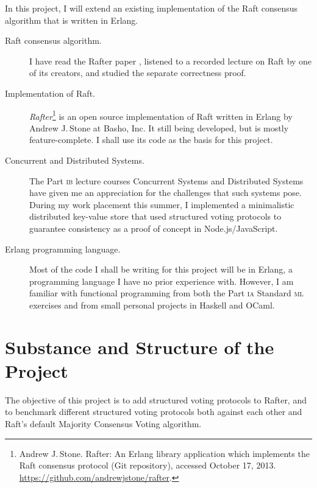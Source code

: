 \documentclass[12pt,chapterprefix=true,toc=bibliography,numbers=noendperiod,
               footnotes=multiple,twoside]{scrreprt}
\begin{document}
In this project, I will extend an existing implementation of the Raft consensus algorithm that is written in Erlang.

\begin{description}

\item[Raft consensus algorithm.] I have read the Rafter paper \autocite{raft}, listened to a recorded lecture on Raft by one of its creators, and studied the separate correctness proof.

\item[Implementation of Raft.] \emph{Rafter}\footnote{Andrew J.\,Stone. Rafter: An Erlang library application which implements the Raft consensus protocol (Git repository), accessed October 17, 2013. \url{https://github.com/andrewjstone/rafter}.} is an open source implementation of Raft written in Erlang by Andrew J.\,Stone at Basho, Inc. It still being developed, but is mostly feature-complete. I shall use its code as the basis for this project.

\item[Concurrent and Distributed Systems.] The Part \textsc{ib} lecture courses Concurrent Systems and Distributed Systems have given me an appreciation for the challenges that such systems pose. During my work placement this summer, I implemented a minimalistic distributed key-value store that used structured voting protocols to guarantee consistency as a proof of concept in Node.js/JavaScript.

\item[Erlang programming language.] Most of the code I shall be writing for this project will be in Erlang, a programming language I have no prior experience with. However, I am familiar with functional programming from both the Part \textsc{ia} Standard \textsc{ml} exercises and from small personal projects in Haskell and OCaml.

\end{description}


\section*{Substance and Structure of the Project%
  \label{substance-and-structure-of-the-project}%
}

The objective of this project is to add structured voting protocols to Rafter, and to benchmark different structured voting protocols both against each other and Raft's default Majority Consensus Voting algorithm.
\end{document}
